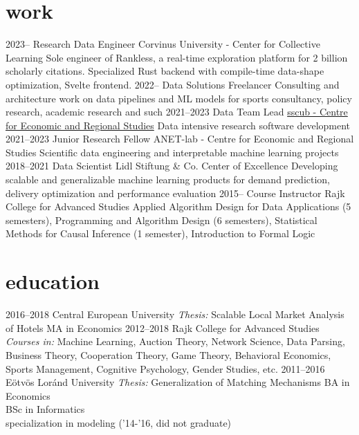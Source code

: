 \documentclass[]{friggeri-cv}
\begin{document}
\section{work}
\begin{entrylist}
  \entry
  {2023--}
  {Research Data Engineer}
  {Corvinus University - Center for Collective Learning}
  {Sole engineer of Rankless, a real-time exploration platform for 2 billion scholarly citations. Specialized Rust backend with compile-time data-shape optimization, Svelte frontend.}
  \entry
  {2022--}
  {Data Solutions Freelancer}
  {}
  {Consulting and architecture work on data pipelines and ML models for sports consultancy, policy research, academic research and such}
  \entry
  {2021--2023}
  {Data Team Lead}
  {\href{https://sscu-budapest.github.io/}{sscub - Centre for Economic and Regional Studies}}
  {Data intensive research software development}
  \entry
  {2021--2023}
  {Junior Research Fellow}
  {ANET-lab - Centre for Economic and Regional Studies}
  {Scientific data engineering and interpretable machine learning projects}
  \entry
  {2018--2021}
  {Data Scientist}
  {Lidl Stiftung \& Co. Center of Excellence}
  {Developing scalable and generalizable machine learning products for demand prediction, delivery optimization and performance evaluation}
  \entry
  {2015--}
  {Course Instructor}
  {Rajk College for Advanced Studies}
  {\small{Applied Algorithm Design for Data Applications (5 semesters), Programming and Algorithm Design (6 semesters), Statistical Methods for Causal Inference (1 semester), Introduction to Formal Logic}}
\end{entrylist}

\section{education}
\begin{entrylist}
  \entry
    {2016--2018}
    {Central European University}
    {\emph{Thesis: }Scalable Local Market Analysis of Hotels}
    {MA in Economics}
  \entry
    {2012--2018}
    {Rajk College for Advanced Studies}
    {\emph{Courses in:} Machine Learning, Auction Theory, Network Science, Data Parsing, Business Theory, Cooperation Theory, Game Theory, Behavioral Economics, Sports Management, Cognitive Psychology, Gender Studies,  etc.}
    {}
  \entry
    {2011--2016}
    {Eötvös Loránd University}
    {\emph{Thesis: }Generalization of Matching Mechanisms}
    {BA in Economics \\ 
     BSc in Informatics\\
     \small{specialization in modeling ('14-'16,  did not graduate)}}
\end{entrylist}
\end{document}

